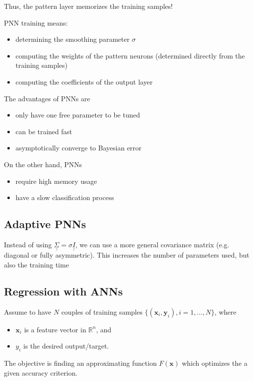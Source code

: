 \documentclass[oneside,onecolumn]{report}
\begin{document}
Thus, the pattern layer memorizes the training samples!

PNN training means:
\begin{itemize}
    \item determining the smoothing parameter $\sigma$
    \item computing the weights of the pattern neurons (determined directly from the training samples)
    \item computing the coefficients of the output layer
\end{itemize}

The advantages of PNNs are
\begin{itemize}
    \item only have one free parameter to be tuned
    \item can be trained fast
    \item asymptotically converge to Bayesian error
\end{itemize}

On the other hand, PNNs
\begin{itemize}
    \item require high memory usage
    \item have a slow classification process
\end{itemize}



\subsection{Adaptive PNNs}
Instead of using $\underline{\underline{\Sigma}} = \sigma \underline{\underline{I}}$, we can use a more general covariance matrix (e.g. diagonal or fully asymmetric).
This increases the number of parameters used, but also the training time



\subsection{Regression with ANNs}
Assume to have $N$ couples of training samples $\{ (\bm x_i, \bm y_i), i = 1, \dots, N\}$, where
\begin{itemize}
    \item $\bm x_i$ is a feature vector in $\mathbb R^n$, and
    \item $y_i$ is the desired output/target.
\end{itemize}

The objective is finding an approximating function $F(\bm x)$ which optimizes the a given accuracy criterion.
\end{document}

